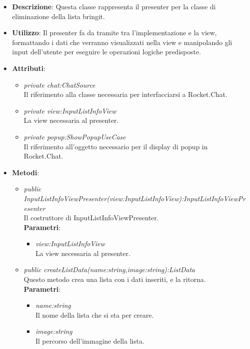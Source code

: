 \begin{itemize}
\item \textbf{Descrizione}: Questa classe rappresenta il presenter per la classe di eliminazione della lista bringit.
\item \textbf{Utilizzo}: Il presenter fa da tramite tra l'implementazione e la view, formattando i dati che verranno visualizzati nella view e manipolando gli input dell'utente per eseguire le operazioni logiche predisposte.
\item \textbf{Attributi}: 
	\begin{itemize}
	\item \textit{private chat:ChatSource}\\
	Il riferimento alla classe necessaria per interfacciarsi a Rocket.Chat.
	\item \textit{private view:InputListInfoView}\\
	La view necessaria al presenter.
	\item \textit{private popup:ShowPopupUseCase}\\
	Il riferimento all'oggetto necessario per il display di popup in Rocket.Chat.
	\end{itemize}
\item \textbf{Metodi}:
	\begin{itemize}
	\item \textit{public InputListInfoViewPresenter(view:InputListInfoView):InputListInfoViewPresenter}\\
	Il costruttore di InputListInfoViewPresenter.
					\\ \textbf{Parametri}: \begin{itemize}
			\item \textit{view:InputListInfoView}\\
			La view necessaria al presenter.
					\end{itemize} 
	\item \textit{public createListData(name:string,image:string):ListData}\\
	Questo metodo crea una lista con i dati inseriti, e la ritorna.
					\\ \textbf{Parametri}: \begin{itemize}
			\item \textit{name:string}\\
			Il nome della lista che si sta per creare.
			\item \textit{image:string}\\
			Il percorso dell'immagine della lista.
					\end{itemize} 
	\end{itemize}
\end{itemize} 
 
